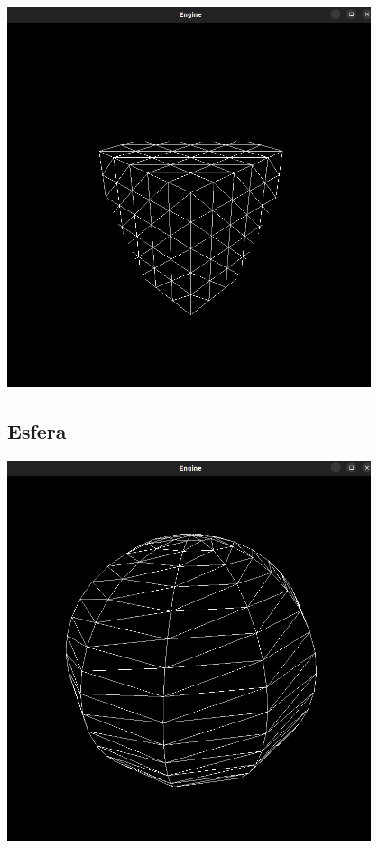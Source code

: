 \begin{center}
    \includegraphics[width=0.8\textwidth]{imgs/final/box.png}
    \label{fig:boxfinal}
\end{center}

\subsection{Esfera}

\begin{center}
    \includegraphics[width=0.8\textwidth]{imgs/final/sphere.png}
    \label{fig:spherefinal}
\end{center}

